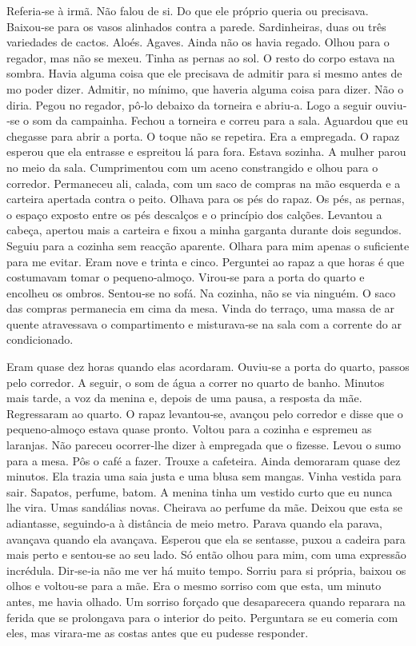 Referia­‑se à irmã. Não falou de si. Do que ele próprio queria ou
precisava. Baixou­‑se para os vasos alinhados contra a parede.
Sardinheiras, duas ou três variedades de cactos. Aloés. Agaves. Ainda
não os havia regado. Olhou para o regador, mas não se mexeu. Tinha as
pernas ao sol. O resto do corpo estava na sombra. Havia alguma coisa que
ele precisava de admitir para si mesmo antes de mo poder dizer. Admitir,
no mínimo, que haveria alguma coisa para dizer. Não o diria. Pegou no
regador, pô­‑lo debaixo da torneira e abriu­‑a. Logo a seguir ouviu­‑se
o som da campainha. Fechou a torneira e correu para a sala. Aguardou que
eu chegasse para abrir a porta. O toque não se repetira. Era a
empregada. O rapaz esperou que ela entrasse e espreitou lá para fora.
Estava sozinha. A mulher parou no meio da sala. Cumprimentou com um
aceno constrangido e olhou para o corredor. Permaneceu ali, calada, com
um saco de compras na mão esquerda e a carteira apertada contra o peito.
Olhava para os pés do rapaz. Os pés, as pernas, o espaço exposto entre
os pés descalços e o princípio dos calções. Levantou a cabeça, apertou
mais a carteira e fixou a minha garganta durante dois segundos. Seguiu
para a cozinha sem reacção aparente. Olhara para mim apenas o suficiente
para me evitar. Eram nove e trinta e cinco. Perguntei ao rapaz a que
horas é que costumavam tomar o pequeno­‑almoço. Virou­‑se para a porta
do quarto e encolheu os ombros. Sentou­‑se no sofá. Na cozinha, não se
via ninguém. O saco das compras permanecia em cima da mesa. Vinda do
terraço, uma massa de ar quente atravessava o compartimento e
misturava­‑se na sala com a corrente do ar condicionado.

Eram quase dez horas quando elas acordaram. Ouviu­‑se a porta do quarto,
passos pelo corredor. A seguir, o som de água a correr no quarto de
banho. Minutos mais tarde, a voz da menina e, depois de uma pausa, a
resposta da mãe. Regressaram ao quarto. O rapaz levantou­‑se, avançou
pelo corredor e disse que o pequeno­‑almoço estava quase pronto. Voltou
para a cozinha e espremeu as laranjas. Não pareceu ocorrer­‑lhe dizer à
empregada que o fizesse. Levou o sumo para a mesa. Pôs o café a fazer.
Trouxe a cafeteira. Ainda demoraram quase dez minutos. Ela trazia uma
saia justa e uma blusa sem mangas. Vinha vestida para sair. Sapatos,
perfume, batom. A menina tinha um vestido curto que eu nunca lhe vira.
Umas sandálias novas. Cheirava ao perfume da mãe. Deixou que esta se
adiantasse, seguindo­‑a à distância de meio metro. Parava quando ela
parava, avançava quando ela avançava. Esperou que ela se sentasse, puxou
a cadeira para mais perto e sentou­‑se ao seu lado. Só então olhou para
mim, com uma expressão incrédula. Dir­‑se­‑ia não me ver há muito tempo.
Sorriu para si própria, baixou os olhos e voltou­‑se para a mãe. Era o
mesmo sorriso com que esta, um minuto antes, me havia olhado. Um sorriso
forçado que desaparecera quando reparara na ferida que se prolongava
para o interior do peito. Perguntara se eu comeria com eles, mas
virara­‑me as costas antes que eu pudesse responder.

